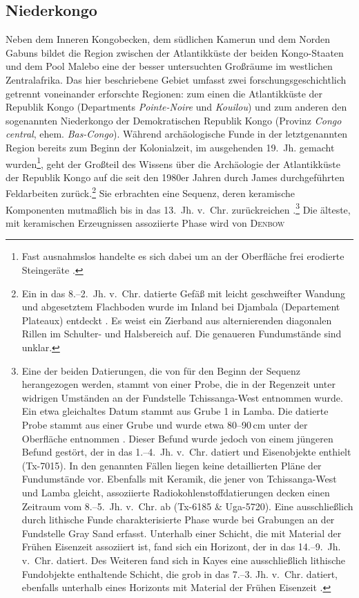 \subsection{Niederkongo}\label{sec:Niederkongo}

Neben dem Inneren Kongobecken, dem südlichen Kamerun und dem Norden Gabuns bildet die Region zwischen der Atlantikküste der beiden Kongo-Staaten und dem Pool Malebo eine der besser untersuchten Großräume im westlichen Zentralafrika. Das hier beschriebene Gebiet umfasst zwei forschungsgeschichtlich getrennt voneinander erforschte Regionen: zum einen die Atlantikküste der Republik Kongo (Departments \textit{Pointe-Noire} und \textit{Kouilou}) und zum anderen den sogenannten Niederkongo der Demokratischen Republik Kongo (Provinz \textit{Congo central}, ehem. \textit{Bas-Congo}). Während archäologische Funde in der letztgenannten Region bereits zum Beginn der Kolonialzeit, im ausgehenden 19.~Jh. gemacht wurden\footnote{Fast ausnahmslos handelte es sich dabei um an der Oberfläche frei erodierte Steingeräte \parencites{Dupont.1887}{Cocheteux.18891890}{Cornet.1896}{Stainier.1899}[siehe auch][9]{deMaret.2018b}.}, geht der Großteil des Wissens über die Archäologie der Atlantikküste der Republik Kongo auf die seit den 1980er Jahren durch James \textcites{Denbow.1990}{Denbow.2012} durchgeführten Feldarbeiten zurück.\footnote{Ein in das 8.--2.~Jh. v.~Chr. datierte Gefäß mit leicht geschweifter Wandung und abgesetztem Flachboden wurde im Inland bei Djambala (Departement Plateaux) entdeckt \parencites[28--30]{Lanfranchi.1988}. Es weist ein Zierband aus alternierenden diagonalen Rillen im Schulter- und Halsbereich auf. Die genaueren Fundumstände sind unklar.} Sie erbrachten eine Sequenz, deren keramische Komponenten mutmaßlich bis in das 13.~Jh. v.~Chr. zurückreichen \parencite[62]{Denbow.2014}.\footnote{Eine der beiden Datierungen, die von \textcite[147; Tx-5956]{Denbow.1990} für den Beginn der Sequenz herangezogen werden, stammt von einer Probe, die in der Regenzeit unter widrigen Umständen an der Fundstelle Tchissanga-West entnommen wurde. Ein etwa gleichaltes Datum stammt aus Grube 1 in Lamba. Die datierte Probe stammt aus einer Grube und wurde etwa 80--90\,cm unter der Oberfläche entnommen \parencite[387 Tab. 1, 393; Tx-7020]{Denbow.2012}. Dieser Befund wurde jedoch von einem jüngeren Befund gestört, der in das 1.--4.~Jh. v.~Chr. datiert und Eisenobjekte enthielt (Tx-7015). In den genannten Fällen liegen keine detaillierten Pläne der Fundumstände vor. Ebenfalls mit Keramik, die jener von Tchissanga-West und Lamba gleicht, assoziierte Radiokohlenstoffdatierungen decken einen Zeitraum vom 8.--5.~Jh. v.~Chr. ab (Tx-6185 \& Uga-5720). Eine ausschließlich durch lithische Funde charakterisierte Phase wurde bei Grabungen an der Fundstelle Gray Sand erfasst. Unterhalb einer Schicht, die mit Material der Frühen Eisenzeit assoziiert ist, fand sich ein Horizont, der in das 14.--9.~Jh. v.~Chr. datiert. Des Weiteren fand sich in Kayes eine ausschließlich lithische Fundobjekte enthaltende Schicht, die grob in das 7.--3. Jh. v.~Chr. datiert, ebenfalls unterhalb eines Horizonts mit Material der Frühen Eisenzeit \parencite[61]{Denbow.2014}.} Die älteste, mit keramischen Erzeugnissen assoziierte Phase wird von \textsc{Denbow} 